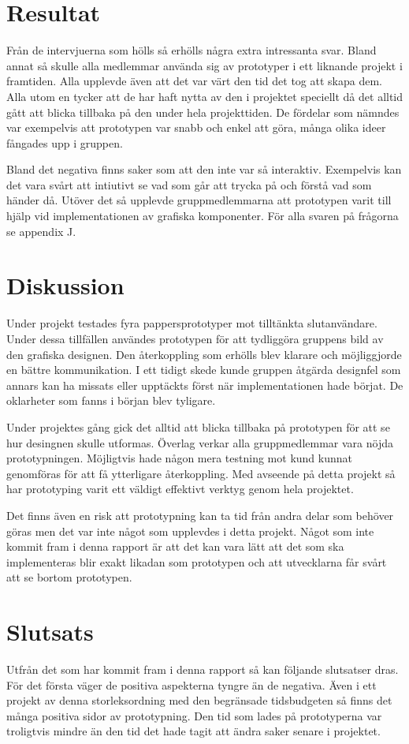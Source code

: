\section{Resultat}
Från de intervjuerna som hölls så erhölls några extra intressanta svar. Bland annat så skulle alla medlemmar använda sig av prototyper i ett liknande projekt i framtiden. Alla upplevde även att det var värt den tid det tog att skapa dem. Alla utom en tycker att de har haft nytta av den i projektet speciellt då det alltid gått att blicka tillbaka på den under hela projekttiden. De fördelar som nämndes var exempelvis att prototypen var snabb och enkel att göra, många olika ideer fångades upp i gruppen. 

Bland det negativa finns saker som att den inte var så interaktiv. Exempelvis kan det vara svårt att intiutivt se vad som går att trycka på och förstå vad som händer då. Utöver det så upplevde gruppmedlemmarna att prototypen varit till hjälp vid implementationen av grafiska komponenter. För alla svaren på frågorna se appendix J.  
  
\section{Diskussion}
Under projekt testades fyra pappersprototyper mot tilltänkta slutanvändare. Under dessa tillfällen användes prototypen för att tydliggöra gruppens bild av den grafiska designen. Den återkoppling som erhölls blev klarare och möjliggjorde en bättre kommunikation. I ett tidigt skede kunde gruppen åtgärda designfel som annars kan ha missats eller upptäckts först när implementationen hade börjat. De oklarheter som fanns i början blev tyligare. 

Under projektes gång gick det alltid att blicka tillbaka på prototypen för att se hur desingnen skulle utformas. Överlag verkar alla gruppmedlemmar vara nöjda prototypningen. Möjligtvis hade någon mera testning mot kund kunnat genomföras för att få ytterligare återkoppling. Med avseende på detta projekt så har prototyping varit ett väldigt effektivt verktyg genom hela projektet. 

Det finns även en risk att prototypning kan ta tid från andra delar som behöver göras men det var inte något som upplevdes i detta projekt. Något som inte kommit fram i denna rapport är att det kan vara lätt att det som ska implementeras blir exakt likadan som prototypen och att utvecklarna får svårt att se bortom prototypen.       

\section{Slutsats}
Utfrån det som har kommit fram i denna rapport så kan följande slutsatser dras. För det första väger de positiva aspekterna tyngre än de negativa. Även i ett projekt av denna storleksordning med den begränsade tidsbudgeten så finns det många positiva sidor av prototypning. Den tid som lades på prototyperna var troligtvis mindre än den tid det hade tagit att ändra saker senare i projektet. 

